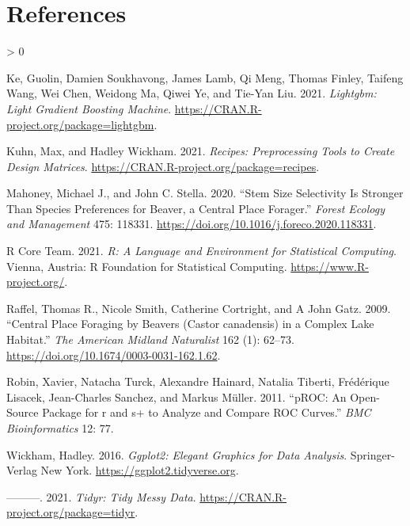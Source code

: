 \documentclass[]{elsarticle} %
\newlength{\cslhangindent}
\newenvironment{CSLReferences}[2] %
 {%
  \setlength{\parindent}{0pt}
  \ifodd #1 \everypar{\setlength{\hangindent}{\cslhangindent}}\ignorespaces\fi
  \ifnum #2 > 0
  \setlength{\parskip}{#2\baselineskip}
  \fi
 }%
 {}
\begin{document}
\newpage{}

\hypertarget{references}{%
\section*{References}\label{references}}

\hypertarget{refs}{}
\begin{CSLReferences}{1}{0}
\leavevmode\hypertarget{ref-lightgbm}{}%
Ke, Guolin, Damien Soukhavong, James Lamb, Qi Meng, Thomas Finley, Taifeng Wang, Wei Chen, Weidong Ma, Qiwei Ye, and Tie-Yan Liu. 2021. \emph{Lightgbm: Light Gradient Boosting Machine}. \url{https://CRAN.R-project.org/package=lightgbm}.

\leavevmode\hypertarget{ref-recipes}{}%
Kuhn, Max, and Hadley Wickham. 2021. \emph{Recipes: Preprocessing Tools to Create Design Matrices}. \url{https://CRAN.R-project.org/package=recipes}.

\leavevmode\hypertarget{ref-Mahoney2020}{}%
Mahoney, Michael J., and John C. Stella. 2020. {``Stem Size Selectivity Is Stronger Than Species Preferences for Beaver, a Central Place Forager.''} \emph{Forest Ecology and Management} 475: 118331. \url{https://doi.org/10.1016/j.foreco.2020.118331}.

\leavevmode\hypertarget{ref-R}{}%
R Core Team. 2021. \emph{R: A Language and Environment for Statistical Computing}. Vienna, Austria: R Foundation for Statistical Computing. \url{https://www.R-project.org/}.

\leavevmode\hypertarget{ref-Raffel2009}{}%
Raffel, Thomas R., Nicole Smith, Catherine Cortright, and A John Gatz. 2009. {``{Central Place Foraging by Beavers (Castor canadensis) in a Complex Lake Habitat}.''} \emph{The American Midland Naturalist} 162 (1): 62--73. \url{https://doi.org/10.1674/0003-0031-162.1.62}.

\leavevmode\hypertarget{ref-pROC}{}%
Robin, Xavier, Natacha Turck, Alexandre Hainard, Natalia Tiberti, Frédérique Lisacek, Jean-Charles Sanchez, and Markus Müller. 2011. {``pROC: An Open-Source Package for r and s+ to Analyze and Compare ROC Curves.''} \emph{BMC Bioinformatics} 12: 77.

\leavevmode\hypertarget{ref-ggplot2}{}%
Wickham, Hadley. 2016. \emph{Ggplot2: Elegant Graphics for Data Analysis}. Springer-Verlag New York. \url{https://ggplot2.tidyverse.org}.

\leavevmode\hypertarget{ref-tidyr}{}%
---------. 2021. \emph{Tidyr: Tidy Messy Data}. \url{https://CRAN.R-project.org/package=tidyr}.


\end{CSLReferences}
\end{document}
